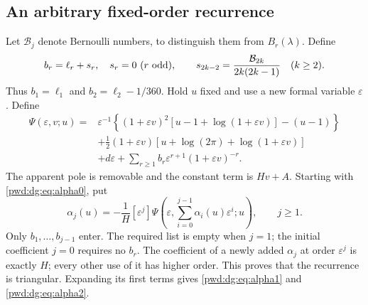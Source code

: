 \documentclass[11pt,letterpaper]{article}
\numberwithin{equation}{section}
\theoremstyle{remark}\newtheorem{remark}[theorem]{Remark}
\newcommand{\eps}{\varepsilon}
\begin{document}
\subsection{An arbitrary fixed-order recurrence}\label{pwd:dg:sec:inverserecurrence}
Let $\mathcal B_j$ denote Bernoulli numbers, to distinguish them from $B_r(\lambda)$. Define
\begin{equation}\label{pwd:dg:eq:br}
 b_r=\ell_r+s_r,\quad s_r=0\ (r\ \hbox{odd}),\qquad
 s_{2k-2}=\frac{\mathcal B_{2k}}{2k(2k-1)}\quad(k\ge2).
\end{equation}
Thus $b_1=\ell_1$ and $b_2=\ell_2-1/360$. Hold $u$ fixed and use a new formal variable $\eps$. Define
\begin{align}
 \Psi(\eps,v;u)={}&\eps^{-1}\left\{(1+\eps v)^2
          [u-1+\log(1+\eps v)]-(u-1)\right\}\nonumber\\
 &+\tfrac12(1+\eps v)[u+\log(2\pi)+\log(1+\eps v)]\nonumber\\
 &+d\eps+\sum_{r\ge1}b_r\eps^{r+1}(1+\eps v)^{-r}.\label{pwd:dg:eq:Psi}
\end{align}
The apparent pole is removable and the constant term is $Hv+A$. Starting with \eqref{pwd:dg:eq:alpha0}, put
\begin{equation}\label{pwd:dg:eq:alpharecurrence}
 \alpha_j(u)=-\frac1H[\eps^j]\Psi\left(\eps,
             \sum_{i=0}^{j-1}\alpha_i(u)\eps^i;u\right),\qquad j\ge1.
\end{equation}
Only $b_1,\ldots,b_{j-1}$ enter. The required list is empty when $j=1$; the initial coefficient $j=0$ requires no $b_r$. The coefficient of a newly added $\alpha_j$ at order $\eps^j$ is exactly $H$; every other use of it has higher order. This proves that the recurrence is triangular. Expanding its first terms gives \eqref{pwd:dg:eq:alpha1} and \eqref{pwd:dg:eq:alpha2}.
\end{document}
